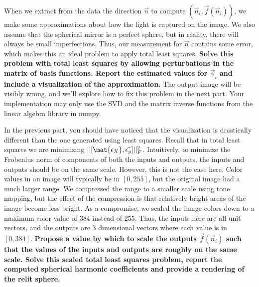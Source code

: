 \documentclass[preview]{standalone}
\begin{document}
\begin{Parts}
	
	
	\Part When we extract from the data the direction $\vec{n}$ to compute  $(\vec{n}_i,\vec{f}(\vec{n}_i))$, we make some approximations about how the light is captured on the image.  We also assume that the spherical mirror is a perfect sphere, but in reality, there will always be small imperfections.  Thus, our measurement for $\vec{n}$ contains some error, which makes this an ideal problem to apply total least squares.  \textbf{Solve this problem with total least squares by allowing perturbations in the matrix of basis functions.  Report the estimated values for $\vec{\gamma}_i$ and include a visualization of the approximation.}  The output image will be visibly wrong, and we'll explore how to fix this problem in the next part.  Your implementation may only use the SVD and the matrix inverse functions from the linear algebra library in numpy.
	
	
	
	\Part In the previous part, you should have noticed that the visualization is drastically different than the one generated using least squares. Recall that in total least squares we are minimizing  $\lvert\lvert[\mat{\epsilon_X},\vec{\epsilon_y}]\rvert\rvert^2_F$. Intuitively, to minimize the Frobenius norm of components of both the inputs and outputs, the inputs and outputs should be on the same scale. However, this is not the case here. Color values in an image will typically be in $[0,255]$, but the original image had a much larger range.  We compressed the range to a smaller scale using tone mapping, but the effect of the compression is that relatively bright areas of the image become less bright.  As a compromise, we scaled the image colors down to a maximum color value of $384$ instead of $255$. Thus, the inputs here are all unit vectors, and the outputs are 3 dimensional vectors where each value is in $[0,384]$.  \textbf{Propose a value by which to scale the outputs $\vec{f}(\vec{n}_i)$ such that the values of the inputs and outputs are roughly on the same scale. Solve this scaled total least squares problem, report the computed spherical harmonic coefficients and provide a rendering of the relit sphere.}
	
		
	
	
\end{Parts}

\pagebreak

\newcommand{\num}{n}
\newcommand{\dims}{d}

\end{document}
